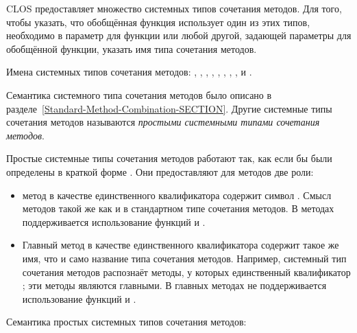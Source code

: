 CLOS предоставляет множество системных типов сочетания методов. Для того, чтобы
указать, что обобщённая функция использует один из этих типов, необходимо в
параметр  для функции  или любой другой,
задающей параметры для обобщённой функции, указать имя типа сочетания методов.

Имена системных типов сочетания методов: \cdf{+}, , ,
, , , , ,  и
. 

Семантика системного  типа сочетания методов было описано в
разделе~\ref{Standard-Method-Combination-SECTION}. Другие системные типы
сочетания методов называются \emph{простыми системными типами сочетания
  методов}.

Простые системные типы сочетания методов работают так, как если бы были
определены в краткой форме . Они предоставляют
для методов две роли:

\begin{itemize}

\item {} метод в качестве единственного квалификатора содержит символ
  . Смысл  методов такой же как и в стандартном типе
  сочетания методов. В  методах поддерживается использование функций
   и .

\item Главный метод в качестве единственного квалификатора содержит такое же
  имя, что и само название типа сочетания методов. Например, системный тип
  сочетания методов  распознаёт методы, у которых единственный
  квалификатор ; эти методы являются главными. В главных методах не
  поддерживается использование функций  и
  .

\end{itemize}

Семантика простых системных типов сочетания методов:

